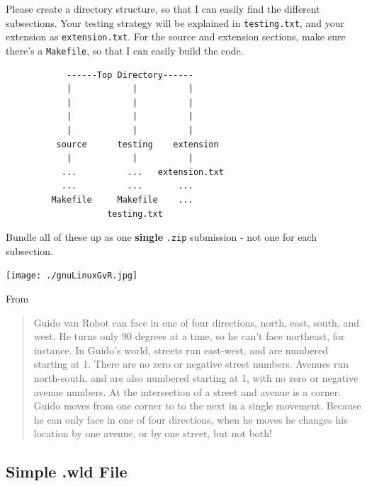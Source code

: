 \begin{exercise}
Please create a directory structure, so that I can easily find the
different subsections.  Your testing strategy will be explained in
\verb^testing.txt^, and your extension as \verb^extension.txt^. For
the source and extension sections, make sure there's a
\verb^Makefile^, so that I can easily build the code.

\begin{verbatim}
            ------Top Directory------
            |            |          |           
            |            |          |           
            |            |          |            
            |            |          |             
          source      testing    extension   
            |            |          |
           ...          ...   extension.txt
           ...          ...       ...
         Makefile     Makefile    ...  
                    testing.txt
\end{verbatim}

Bundle all of these up as one {\bf single} \verb^.zip^ submission -
not one for each subsection.
\end{exercise}


\begin{center}
\texttt{[image: ./gnuLinuxGvR.jpg]}
\end{center}

From 
{\small
\begin{quote}
Guido van Robot can face in one of four directions, north, east, south, and west. He turns only 90 degrees at a time, so he can't face northeast, for instance. In Guido's world, streets run east-west, and are numbered starting at 1. There are no zero or negative street numbers. Avenues run north-south, and are also numbered starting at 1, with no zero or negative avenue numbers. At the intersection of a street and avenue is a corner. Guido moves from one corner to to the next in a single movement. Because he can only face in one of four directions, when he moves he changes his location by one avenue, or by one street, but not both!
\end{quote}
}

\subsection*{Simple .wld File}

